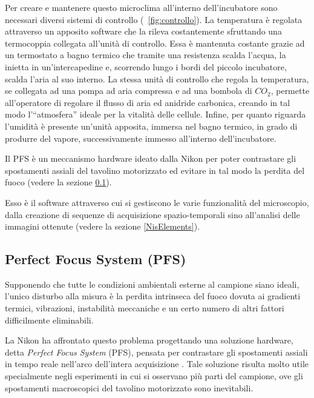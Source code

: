 \begin{description}
Per creare e mantenere questo microclima all'interno dell'incubatore sono necessari diversi sistemi di controllo (\figurename~\ref{fig:controllo}). 
La temperatura è regolata attraverso un apposito software che la rileva costantemente sfruttando una termocoppia collegata all'unità di controllo. 
Essa è mantenuta costante grazie ad un termostato a bagno termico che tramite una resistenza scalda l'acqua, la inietta in un'intercapedine e, scorrendo lungo i bordi del piccolo incubatore, scalda l'aria al suo interno.
La stessa unità di controllo che regola la temperatura, se collegata ad una pompa ad aria compressa e ad una bombola di $CO_2$, permette all'operatore di regolare il flusso di aria ed anidride carbonica, creando in tal modo l'``atmosfera'' ideale per la vitalità delle cellule.
Infine, per quanto riguarda l'umidità è presente un'unità apposita, immersa nel bagno termico, in grado di produrre del vapore, successivamente immesso all'interno dell'incubatore.

\item[Perfect Focus System (PFS):]
Il PFS è un meccanismo hardware ideato dalla Nikon per poter contrastare gli spostamenti assiali del tavolino motorizzato ed evitare in tal modo la perdita del fuoco (vedere la sezione \ref{PFS}).

\item[Software Nis-Element 3.1:]
Esso è il software attraverso cui si gestiscono le varie funzionalità del microscopio, dalla creazione di sequenze di acquisizione spazio-temporali sino all'analisi delle immagini ottenute (vedere la sezione \ref{NisElements}).

\end{description}


\subsection{Perfect Focus System (PFS)}\label{PFS}

Supponendo che tutte le condizioni ambientali esterne al campione siano ideali, l'unico disturbo alla misura è la perdita intrinseca del fuoco dovuta ai gradienti termici, vibrazioni, instabilità meccaniche e un certo numero di altri fattori difficilmente eliminabili.

La Nikon ha affrontato questo problema progettando una soluzione hardware, detta \textit{Perfect Focus System} (PFS), pensata per contrastare gli spostamenti assiali in tempo reale nell'arco dell'intera acquisizione \cite{Nikon2}. 
Tale soluzione risulta molto utile specialmente negli esperimenti in cui si osservano più parti del campione, ove gli spostamenti macroscopici del tavolino motorizzato sono inevitabili.

